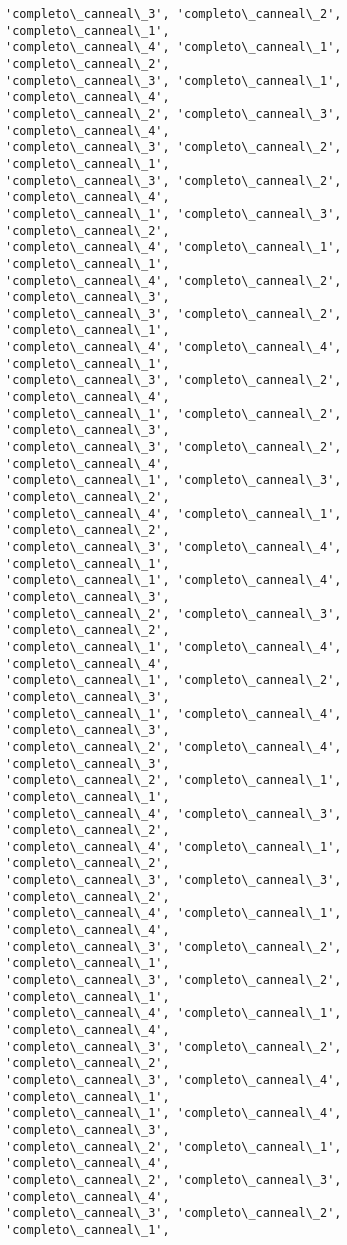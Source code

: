 \documentclass[11pt]{article}
\begin{document}
\begin{Verbatim}[commandchars=\\\{\}]
'completo\_canneal\_3', 'completo\_canneal\_2', 'completo\_canneal\_1',
'completo\_canneal\_4', 'completo\_canneal\_1', 'completo\_canneal\_2',
'completo\_canneal\_3', 'completo\_canneal\_1', 'completo\_canneal\_4',
'completo\_canneal\_2', 'completo\_canneal\_3', 'completo\_canneal\_4',
'completo\_canneal\_3', 'completo\_canneal\_2', 'completo\_canneal\_1',
'completo\_canneal\_3', 'completo\_canneal\_2', 'completo\_canneal\_4',
'completo\_canneal\_1', 'completo\_canneal\_3', 'completo\_canneal\_2',
'completo\_canneal\_4', 'completo\_canneal\_1', 'completo\_canneal\_1',
'completo\_canneal\_4', 'completo\_canneal\_2', 'completo\_canneal\_3',
'completo\_canneal\_3', 'completo\_canneal\_2', 'completo\_canneal\_1',
'completo\_canneal\_4', 'completo\_canneal\_4', 'completo\_canneal\_1',
'completo\_canneal\_3', 'completo\_canneal\_2', 'completo\_canneal\_4',
'completo\_canneal\_1', 'completo\_canneal\_2', 'completo\_canneal\_3',
'completo\_canneal\_3', 'completo\_canneal\_2', 'completo\_canneal\_4',
'completo\_canneal\_1', 'completo\_canneal\_3', 'completo\_canneal\_2',
'completo\_canneal\_4', 'completo\_canneal\_1', 'completo\_canneal\_2',
'completo\_canneal\_3', 'completo\_canneal\_4', 'completo\_canneal\_1',
'completo\_canneal\_1', 'completo\_canneal\_4', 'completo\_canneal\_3',
'completo\_canneal\_2', 'completo\_canneal\_3', 'completo\_canneal\_2',
'completo\_canneal\_1', 'completo\_canneal\_4', 'completo\_canneal\_4',
'completo\_canneal\_1', 'completo\_canneal\_2', 'completo\_canneal\_3',
'completo\_canneal\_1', 'completo\_canneal\_4', 'completo\_canneal\_3',
'completo\_canneal\_2', 'completo\_canneal\_4', 'completo\_canneal\_3',
'completo\_canneal\_2', 'completo\_canneal\_1', 'completo\_canneal\_1',
'completo\_canneal\_4', 'completo\_canneal\_3', 'completo\_canneal\_2',
'completo\_canneal\_4', 'completo\_canneal\_1', 'completo\_canneal\_2',
'completo\_canneal\_3', 'completo\_canneal\_3', 'completo\_canneal\_2',
'completo\_canneal\_4', 'completo\_canneal\_1', 'completo\_canneal\_4',
'completo\_canneal\_3', 'completo\_canneal\_2', 'completo\_canneal\_1',
'completo\_canneal\_3', 'completo\_canneal\_2', 'completo\_canneal\_1',
'completo\_canneal\_4', 'completo\_canneal\_1', 'completo\_canneal\_4',
'completo\_canneal\_3', 'completo\_canneal\_2', 'completo\_canneal\_2',
'completo\_canneal\_3', 'completo\_canneal\_4', 'completo\_canneal\_1',
'completo\_canneal\_1', 'completo\_canneal\_4', 'completo\_canneal\_3',
'completo\_canneal\_2', 'completo\_canneal\_1', 'completo\_canneal\_4',
'completo\_canneal\_2', 'completo\_canneal\_3', 'completo\_canneal\_4',
'completo\_canneal\_3', 'completo\_canneal\_2', 'completo\_canneal\_1',

\end{Verbatim}
\end{document}
